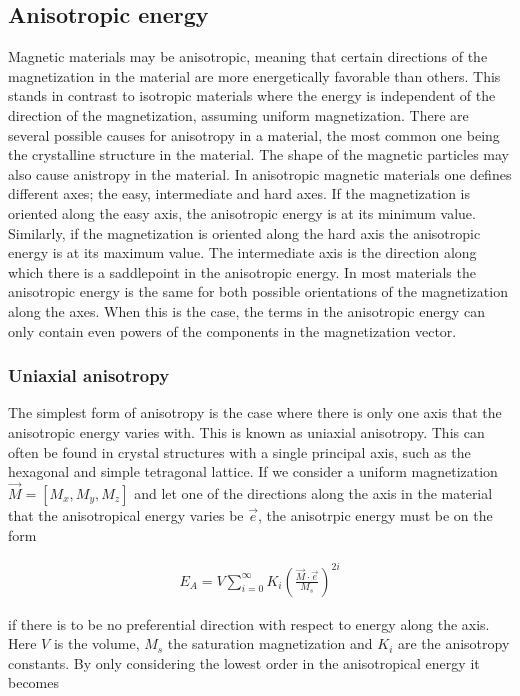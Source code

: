 \subsection{Anisotropic energy}
Magnetic materials may be anisotropic, meaning that certain directions of the magnetization in the material are more energetically favorable than others. This stands in contrast to isotropic materials where the energy is independent of the direction of the magnetization, assuming uniform magnetization. There are several possible causes for anisotropy in a material, the most common one being the crystalline structure in the material. The shape of the magnetic particles may also cause anistropy in the material. In anisotropic magnetic materials one defines different axes; the easy, intermediate and hard axes. If the magnetization is oriented along the easy axis, the anisotropic energy is at its minimum value. Similarly, if the magnetization is oriented along the hard axis the anisotropic energy is at its maximum value. The intermediate axis is the direction along which there is a saddlepoint in the anisotropic energy. In most materials the anisotropic energy is the same for both possible orientations of the magnetization along the axes. When this is the case, the terms in the anisotropic energy can only contain even powers of the components in the magnetization vector.

\subsubsection{Uniaxial anisotropy}
The simplest form of anisotropy is the case where there is only one axis that the anisotropic energy varies with. This is known as uniaxial anisotropy. This can often be found in crystal structures with a single principal axis, such as the hexagonal and simple tetragonal lattice. If we consider a uniform magnetization $\vec{M} = \left[M_x, M_y, M_z\right]$ and let one of the directions along the axis in the material that the anisotropical energy varies be $\vec{e}$, the anisotrpic energy must be on the form

\begin{align}
E_A = V \sum_{i=0}^{\infty} K_i (\frac{\vec{M}\cdot\vec{e}}{M_s})^{2i}
\end{align}

if there is to be no preferential direction with respect to energy along the axis. Here $V$ is the volume, $M_s$ the saturation magnetization and $K_i$ are the anisotropy constants. By only considering the lowest order in the anisotropical energy it becomes

